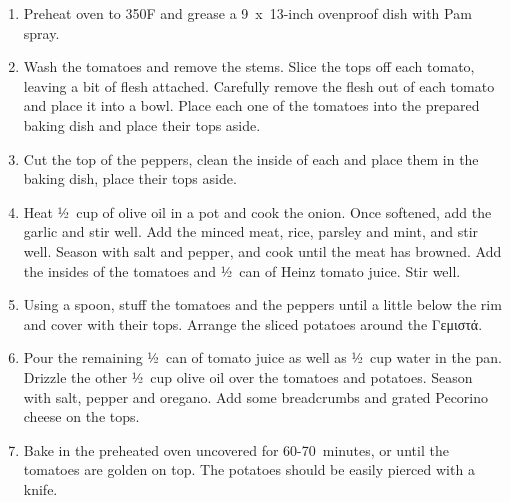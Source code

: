 \begin{enumerate}
    \item Preheat oven to 350\degree F and grease a 9~x~13-inch ovenproof dish with Pam spray.
    \item Wash the tomatoes and remove the stems. Slice the tops off each tomato, leaving a bit of flesh attached. Carefully remove the flesh out of each tomato and place it into a bowl. Place each one of the tomatoes into the prepared baking dish and place their tops aside.
    \item Cut the top of the peppers, clean the inside of each and place them in the baking dish, place their tops aside.
    \item Heat ½~cup of olive oil in a pot and cook the onion. Once softened, add the garlic and stir well. Add the minced meat, rice, parsley and mint, and stir well. Season with salt and pepper, and cook until the meat has browned. Add the insides of the tomatoes and ½~can of Heinz tomato juice. Stir well.
    \item Using a spoon, stuff the tomatoes and the peppers until a little below the rim and cover with their tops. Arrange the sliced potatoes around the \textgreek{Γεμιστά}.
    \item Pour the remaining ½~can of tomato juice as well as ½~cup water in the pan. Drizzle the other ½~cup olive oil over the tomatoes and potatoes. Season with salt, pepper and oregano. Add some breadcrumbs and grated Pecorino cheese on the tops.
    \item Bake in the preheated oven uncovered for 60-70~minutes, or until the tomatoes are golden on top. The potatoes should be easily pierced with a knife.
\end{enumerate}
